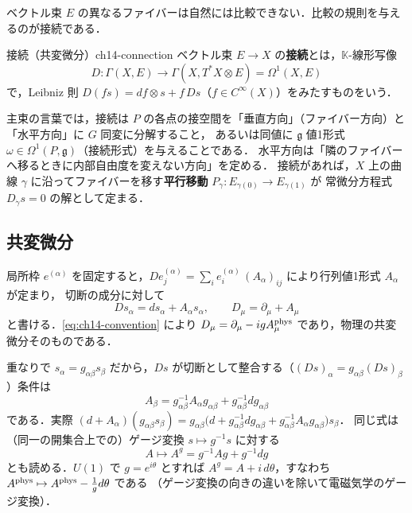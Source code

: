 ベクトル束 $E$ の異なるファイバーは自然には比較できない．比較の規則を与えるのが接続である．

\begin{mydef}{接続（共変微分）}{ch14-connection}
ベクトル束 $E\to X$ の\textbf{接続}とは，$\mathbb{K}$-線形写像
\begin{equation}
  D:\Gamma(X,E)\to\Gamma(X,T^*X\otimes E)=\Omega^1(X,E)
\end{equation}
で，Leibniz 則 $D(fs) = df\otimes s + f\,Ds$（$f\in C^\infty(X)$）をみたすものをいう．
\end{mydef}

主束の言葉では，接続は $P$ の各点の接空間を「垂直方向」（ファイバー方向）と「水平方向」に $G$ 同変に分解すること，
あるいは同値に $\mathfrak{g}$ 値1形式 $\omega\in\Omega^1(P,\mathfrak{g})$（接続形式）を与えることである．
水平方向は「隣のファイバーへ移るときに内部自由度を変えない方向」を定める．
接続があれば，$X$ 上の曲線 $\gamma$ に沿ってファイバーを移す\textbf{平行移動} $P_\gamma:E_{\gamma(0)}\to E_{\gamma(1)}$ が
常微分方程式 $D_{\dot\gamma}s=0$ の解として定まる．

\subsection{共変微分}

局所枠 $e^{(\alpha)}$ を固定すると，$D e^{(\alpha)}_j = \sum_i e^{(\alpha)}_i\,(A_\alpha)_{ij}$ により行列値1形式 $A_\alpha$ が定まり，
切断の成分に対して
\begin{equation}
  D s_\alpha = d s_\alpha + A_\alpha s_\alpha,\qquad D_\mu = \partial_\mu + A_\mu
\end{equation}
と書ける．\eqref{eq:ch14-convention} により $D_\mu = \partial_\mu - igA^{\rm phys}_\mu$ であり，物理の共変微分そのものである．

重なりで $s_\alpha=g_{\alpha\beta}s_\beta$ だから，$Ds$ が切断として整合する（$(Ds)_\alpha = g_{\alpha\beta}(Ds)_\beta$）条件は
\begin{equation}
  A_\beta = g_{\alpha\beta}^{-1}A_\alpha g_{\alpha\beta} + g_{\alpha\beta}^{-1}dg_{\alpha\beta}
  \label{eq:ch14-A-transform}
\end{equation}
である．実際 $(d+A_\alpha)(g_{\alpha\beta}s_\beta) = g_{\alpha\beta}\bigl(d + g_{\alpha\beta}^{-1}dg_{\alpha\beta} + g_{\alpha\beta}^{-1}A_\alpha g_{\alpha\beta}\bigr)s_\beta$．
同じ式は（同一の開集合上での）ゲージ変換 $s\mapsto g^{-1}s$ に対する
\begin{equation}
  A\mapsto A^g = g^{-1}Ag + g^{-1}dg
\end{equation}
とも読める．$U(1)$ で $g=e^{i\theta}$ とすれば $A^g = A + i\,d\theta$，すなわち $A^{\rm phys}\mapsto A^{\rm phys}-\frac1g d\theta$ である
（ゲージ変換の向きの違いを除いて電磁気学のゲージ変換）．

